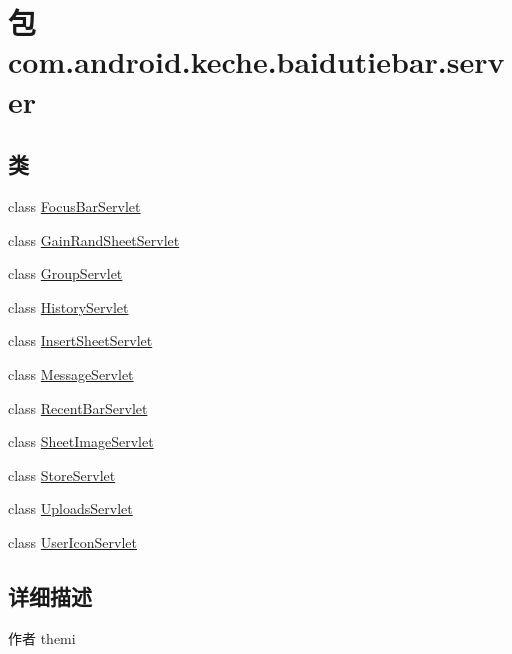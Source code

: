 \hypertarget{namespacecom_1_1android_1_1keche_1_1baidutiebar_1_1server}{}\section{包 com.\+android.\+keche.\+baidutiebar.\+server}
\label{namespacecom_1_1android_1_1keche_1_1baidutiebar_1_1server}
\subsection*{类}
\begin{DoxyCompactItemize}
\item 
class \mbox{\hyperlink{classcom_1_1android_1_1keche_1_1baidutiebar_1_1server_1_1_focus_bar_servlet}{Focus\+Bar\+Servlet}}
\item 
class \mbox{\hyperlink{classcom_1_1android_1_1keche_1_1baidutiebar_1_1server_1_1_gain_rand_sheet_servlet}{Gain\+Rand\+Sheet\+Servlet}}
\item 
class \mbox{\hyperlink{classcom_1_1android_1_1keche_1_1baidutiebar_1_1server_1_1_group_servlet}{Group\+Servlet}}
\item 
class \mbox{\hyperlink{classcom_1_1android_1_1keche_1_1baidutiebar_1_1server_1_1_history_servlet}{History\+Servlet}}
\item 
class \mbox{\hyperlink{classcom_1_1android_1_1keche_1_1baidutiebar_1_1server_1_1_insert_sheet_servlet}{Insert\+Sheet\+Servlet}}
\item 
class \mbox{\hyperlink{classcom_1_1android_1_1keche_1_1baidutiebar_1_1server_1_1_message_servlet}{Message\+Servlet}}
\item 
class \mbox{\hyperlink{classcom_1_1android_1_1keche_1_1baidutiebar_1_1server_1_1_recent_bar_servlet}{Recent\+Bar\+Servlet}}
\item 
class \mbox{\hyperlink{classcom_1_1android_1_1keche_1_1baidutiebar_1_1server_1_1_sheet_image_servlet}{Sheet\+Image\+Servlet}}
\item 
class \mbox{\hyperlink{classcom_1_1android_1_1keche_1_1baidutiebar_1_1server_1_1_store_servlet}{Store\+Servlet}}
\item 
class \mbox{\hyperlink{classcom_1_1android_1_1keche_1_1baidutiebar_1_1server_1_1_uploads_servlet}{Uploads\+Servlet}}
\item 
class \mbox{\hyperlink{classcom_1_1android_1_1keche_1_1baidutiebar_1_1server_1_1_user_icon_servlet}{User\+Icon\+Servlet}}
\end{DoxyCompactItemize}


\subsection{详细描述}
\begin{DoxyAuthor}{作者}
themi 
\end{DoxyAuthor}
